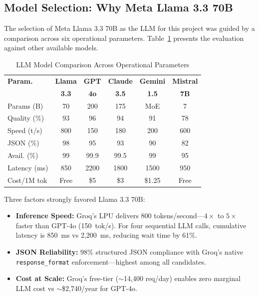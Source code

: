 \documentclass[conference]{IEEEtran}
\begin{document}
\subsection{Model Selection: Why Meta Llama 3.3 70B}
The selection of Meta Llama 3.3 70B as the LLM for this project was guided by a comparison across six operational parameters. Table~\ref{tab:models} presents the evaluation against other available models.

\begin{table}[H]
\centering
\caption{LLM Model Comparison Across Operational Parameters}
\label{tab:models}
\scriptsize
\renewcommand{\arraystretch}{1.1}
\setlength{\tabcolsep}{2pt}
\begin{tabularx}{\columnwidth}{|X|c|c|c|c|c|}
\hline
\textbf{Param.} & \textbf{Llama} & \textbf{GPT} & \textbf{Claude} & \textbf{Gemini} & \textbf{Mistral} \\
 & \textbf{3.3} & \textbf{4o} & \textbf{3.5} & \textbf{1.5} & \textbf{7B} \\
\hline
Params (B)  & 70  & 200 & 175 & MoE & 7 \\
Quality (\%) & 93  & 96  & 94  & 91  & 78 \\
Speed (t/s)  & 800 & 150 & 180 & 200 & 600 \\
JSON (\%)    & 98  & 95  & 93  & 90  & 82 \\
Avail. (\%)  & 99  & 99.9 & 99.5 & 99 & 95 \\
Latency (ms) & 850 & 2200 & 1800 & 1500 & 950 \\
Cost/1M tok  & Free & \$5 & \$3 & \$1.25 & Free \\
\hline
\end{tabularx}
\end{table}

Three factors strongly favored Llama 3.3 70B:
\begin{itemize}
    \item \textbf{Inference Speed:} Groq's LPU delivers 800 tokens/second---$4\times$ to $5\times$ faster than GPT-4o (150~tok/s). For four sequential LLM calls, cumulative latency is 850~ms vs 2,200~ms, reducing wait time by 61\%.
    \item \textbf{JSON Reliability:} 98\% structured JSON compliance with Groq's native \texttt{response\_format} enforcement---highest among all candidates.
    \item \textbf{Cost at Scale:} Groq's free-tier (${\sim}$14,400 req/day) enables zero marginal LLM cost vs ${\sim}$\$2,740/year for GPT-4o.
\end{itemize}
\end{document}
